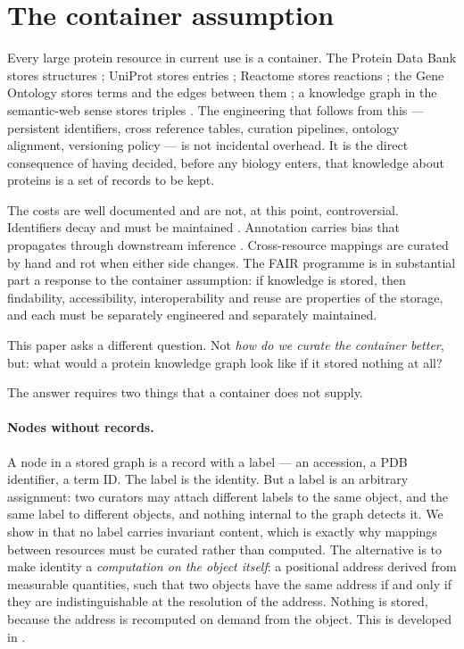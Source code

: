\documentclass[11pt,twocolumn,a4paper]{article}
\theoremstyle{thmstyle}
\theoremstyle{definition}
\theoremstyle{remark}
\begin{document}
\tableofcontents

\section{The container assumption}
\label{sec:container}

Every large protein resource in current use is a container. The Protein
Data Bank stores structures \citep{berman2000,burley2023}; UniProt
stores entries \citep{uniprot2023}; Reactome stores reactions
\citep{milacic2024}; the Gene Ontology stores terms and the edges
between them \citep{ashburner2000,go2023}; a knowledge graph in the
semantic-web sense stores triples \citep{hogan2021,unni2022}. The
engineering that follows from this --- persistent identifiers, cross
reference tables, curation pipelines, ontology alignment, versioning
policy --- is not incidental overhead. It is the direct consequence of
having decided, before any biology enters, that knowledge about
proteins is a set of records to be kept.

The costs are well documented and are not, at this point, controversial.
Identifiers decay and must be maintained \citep{wren2008,mcmurry2017}.
Annotation carries bias that propagates through downstream inference
\citep{gaudet2017}. Cross-resource mappings are curated by hand and
rot when either side changes. The FAIR programme
\citep{wilkinson2016} is in substantial part a response to the
container assumption: if knowledge is stored, then findability,
accessibility, interoperability and reuse are properties of the
storage, and each must be separately engineered and separately
maintained.

This paper asks a different question. Not \emph{how do we curate the
container better}, but: what would a protein knowledge graph look like
if it stored nothing at all?

The answer requires two things that a container does not supply.

\paragraph{Nodes without records.}
A node in a stored graph is a record with a label --- an accession, a
PDB identifier, a term ID. The label is the identity. But a label is
an arbitrary assignment: two curators may attach different labels to
the same object, and the same label to different objects, and nothing
internal to the graph detects it. We show in
 that no label carries invariant content, which is
exactly why mappings between resources must be curated rather than
computed. The alternative is to make identity a \emph{computation on
the object itself}: a positional address derived from measurable
quantities, such that two objects have the same address if and only if
they are indistinguishable at the resolution of the address. Nothing
is stored, because the address is recomputed on demand from the
object. This is developed in .
\end{document}
